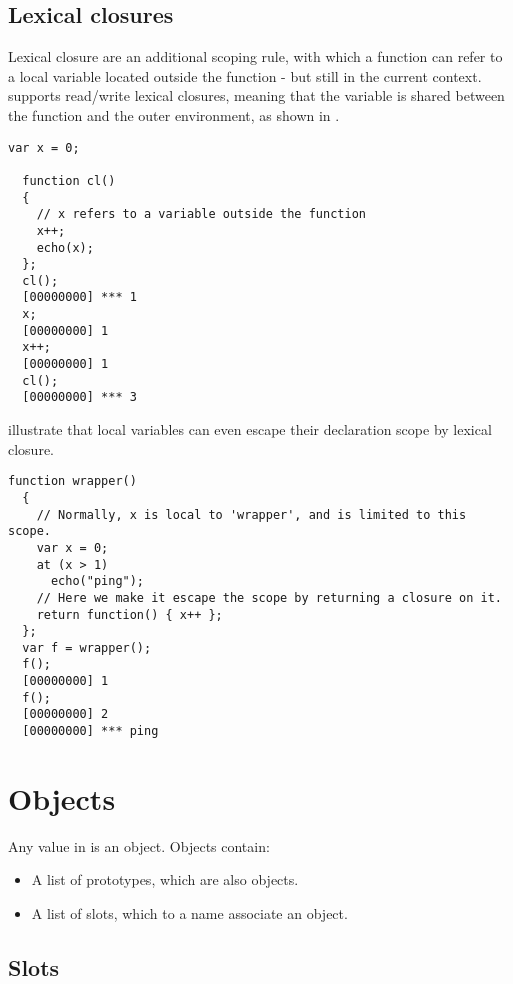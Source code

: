 \documentclass[openright,twoside,12pt]{report}
\begin{document}
\subsection{Lexical closures}
\label{sect:us-fun-closures}

Lexical closure are an additional scoping rule, with which a function
can refer to a local variable located outside the function - but still
in the current context. \us supports read/write lexical closures,
meaning that the variable is shared between the function and the outer
environment, as shown in .

\begin{lstlisting}[caption=Lexical
  closure,label=lst:function-closure,float=\floatpos]
  var x = 0;

  function cl()
  {
    // x refers to a variable outside the function
    x++;
    echo(x);
  };
  cl();
  [00000000] *** 1
  x;
  [00000000] 1
  x++;
  [00000000] 1
  cl();
  [00000000] *** 3
\end{lstlisting}

 illustrate that local variables can even
escape their declaration scope by lexical closure.

\begin{lstlisting}[caption=Local variable escaping its scope by
  lexical closure.,label=lst:function-closure-escape,float=\floatpos]
  function wrapper()
  {
    // Normally, x is local to 'wrapper', and is limited to this scope.
    var x = 0;
    at (x > 1)
      echo("ping");
    // Here we make it escape the scope by returning a closure on it.
    return function() { x++ };
  };
  var f = wrapper();
  f();
  [00000000] 1
  f();
  [00000000] 2
  [00000000] *** ping
\end{lstlisting}

\FloatBarrier
\section{Objects}

Any value in \us is an object. Objects contain:

\begin{itemize}
\item A list of prototypes, which are also objects.
\item A list of slots, which to a name associate an object.
\end{itemize}

\subsection{Slots}
\end{document}
